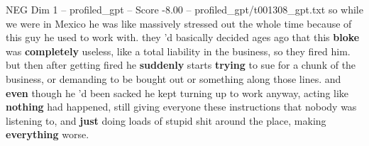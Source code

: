 \begin{textsample}{NEG Dim 1 – profiled\_gpt – Score -8.00 – profiled\_gpt/t001308\_gpt.txt}  \label{ex:f1_neg_008}
so while we were in Mexico he was like massively stressed out the whole time because of this guy he used to work with. they ’d basically decided ages ago that this \textbf{bloke} was \textbf{completely} useless, like a total liability in the business, so they fired him. but then after getting fired he \textbf{suddenly} starts \textbf{trying} to sue for a chunk of the business, or demanding to be bought out or something along those lines. and \textbf{even} though he ’d been sacked he kept turning up to work anyway, acting like \textbf{nothing} had happened, still giving everyone these instructions that nobody was listening to, and \textbf{just} doing loads of stupid shit around the place, making \textbf{everything} worse.

\end{textsample}
